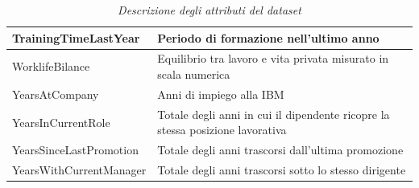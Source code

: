 \begin{table}
\begin{tabular}{ |p{6.5cm}|p{8cm}|}
\hline
TrainingTimeLastYear& Periodo di formazione nell'ultimo anno\\
\hline
WorklifeBilance & Equilibrio tra lavoro e vita privata misurato in scala numerica\\
\hline
YearsAtCompany & Anni di impiego alla IBM\\
\hline
YearsInCurrentRole& Totale degli anni in cui il dipendente ricopre la stessa posizione lavorativa\\
\hline
YearsSinceLastPromotion&Totale degli anni trascorsi dall'ultima promozione\\
\hline
YearsWithCurrentManager& Totale degli anni trascorsi sotto lo stesso dirigente \\
 \hline
\end{tabular}
\caption{\textit{Descrizione degli attributi del dataset}}
\label{Descrizionefeature}
\end{table}

